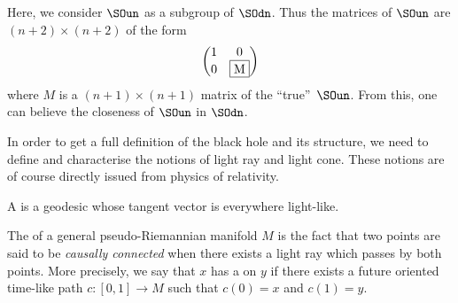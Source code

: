 \begin{remark}
Here, we consider $\SOun$ as a subgroup of $\SOdn$. Thus the matrices of $\SOun$ are $(n+2)\times (n+2)$ of the form
\[
\begin{pmatrix}
   1 & 0\\
   0 & \fbox{M}
\end{pmatrix}
\]
where $M$ is a $(n+1)\times (n+1)$ matrix of the ``true''\ $\SOun$. From this, one can believe the closeness of $\SOun$ in $\SOdn$.
\end{remark}

In order to get a full definition of the black hole and its structure, we need to define and characterise the notions of light ray and light cone. These notions are of course directly issued from physics of relativity.
\begin{definition}
A  is a geodesic whose tangent vector is everywhere light-like.
\label{lightraycone}
 \end{definition}

The  of a general pseudo-Riemannian manifold $M$ is the fact that two points are said to be \emph{causally connected} when there exists a light ray which passes by both points. More precisely, we say that $x$ has a  on $y$ if there exists a future oriented time-like path $c\colon [0,1]\to M$ such that $c(0)=x$ and $c(1)=y$.

